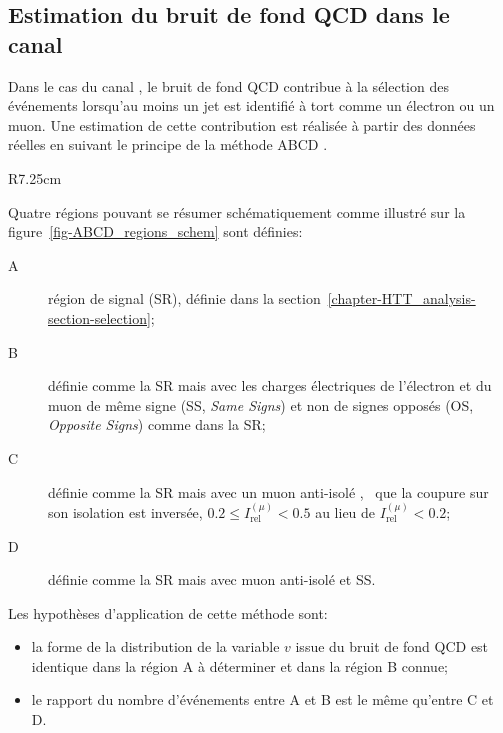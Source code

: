 \subsection{Estimation du bruit de fond QCD dans le canal \ele\mu}\label{chapter-HTT_analysis-section-bg_estimation-QCD-SS}
Dans le cas du canal \ele\mu, le bruit de fond QCD contribue à la sélection des événements lorsqu'au moins un jet est identifié à tort comme un électron ou un muon.
Une estimation de cette contribution est réalisée à partir des données réelles en suivant le principe de la méthode \og ABCD \fg.
\begin{wrapfigure}{R}{7.25cm}
\centering
{}
\caption{Définition schématique des régions A, B, C et D pour l'estimation du bruit de fond QCD.}
\label{fig-ABCD_regions_schem}
\end{wrapfigure}
\par
Quatre régions pouvant se résumer schématiquement comme illustré sur la figure~\ref{fig-ABCD_regions_schem} sont définies:
\begin{description}
\item[A] région de signal (SR), définie dans la section~\ref{chapter-HTT_analysis-section-selection};
\item[B] définie comme la SR mais avec les charges électriques de l'électron et du muon de même signe (SS, \emph{Same Signs}) et non de signes opposés (OS, \emph{Opposite Signs}) comme dans la SR;
\item[C] définie comme la SR mais avec un muon \og anti-isolé \fg{}, \ie\ que la coupure sur son isolation est inversée, $\num{0.2}\leq I_\text{rel}^{(\mu)} < \num{0.5}$ au lieu de $I_\text{rel}^{(\mu)} < \num{0.2}$;
\item[D] définie comme la SR mais avec muon anti-isolé et SS.
\end{description}
Les hypothèses d'application de cette méthode sont:
\begin{itemize}
\item la forme de la distribution de la variable $v$ issue du bruit de fond QCD est identique dans la région A à déterminer et dans la région B connue;
\item le rapport du nombre d'événements entre A et B est le même qu'entre C et D.
\end{itemize}
